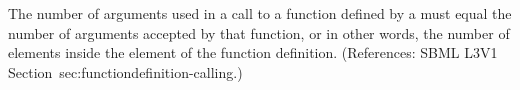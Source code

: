 The number of arguments used in a call to a function defined by a
\FunctionDefinition must equal the number of arguments accepted by that
function, or in other words, the number of  elements inside the
 element of the function definition.  (References: SBML L3V1
Section~{sec:functiondefinition-calling}.) 
